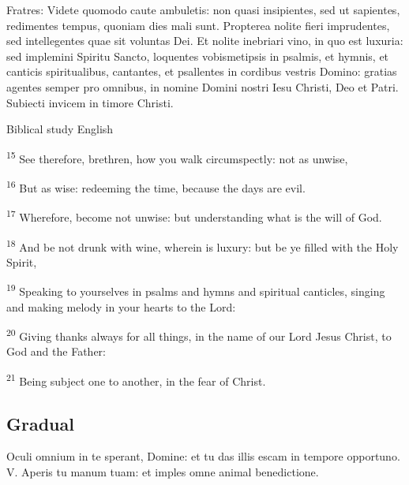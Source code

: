 
\begin{latinproper}
Fratres: Videte quomodo caute ambuletis: non quasi insipientes, sed ut sapientes, redimentes tempus, quoniam dies mali sunt. Propterea nolite fieri imprudentes, sed intellegentes quae sit voluntas Dei. Et nolite inebriari vino, in quo est luxuria: sed implemini Spiritu Sancto, loquentes vobismetipsis in psalmis, et hymnis, et canticis spiritualibus, cantantes, et psallentes in cordibus vestris Domino: gratias agentes semper pro omnibus, in nomine Domini nostri Iesu Christi, Deo et Patri. Subiecti invicem in timore Christi.
\end{latinproper}

\begin{englishwitness}{Biblical study English}

\textsuperscript{15} See therefore, brethren, how you walk circumspectly: not as unwise,

\textsuperscript{16} But as wise: redeeming the time, because the days are evil.

\textsuperscript{17} Wherefore, become not unwise: but understanding what is the will of God.

\textsuperscript{18} And be not drunk with wine, wherein is luxury: but be ye filled with the Holy Spirit,

\textsuperscript{19} Speaking to yourselves in psalms and hymns and spiritual canticles, singing and making melody in your hearts to the Lord:

\textsuperscript{20} Giving thanks always for all things, in the name of our Lord Jesus Christ, to God and the Father:

\textsuperscript{21} Being subject one to another, in the fear of Christ.

\end{englishwitness}

\subsection{Gradual}\label{proper-gradual}


\begin{latinproper}
Oculi omnium in te sperant, Domine: et tu das illis escam in tempore opportuno. V. Aperis tu manum tuam: et imples omne animal benedictione.
\end{latinproper}

